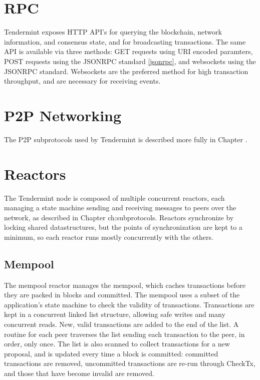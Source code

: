 \section{RPC}

Tendermint exposes HTTP API's for querying the blockchain, network information, and consensus state, and for broadcasting transactions.
The same API is available via three methods: GET requests using URI encoded paramters, POST requests using the JSONRPC standard \ref{jsonrpc}, 
and websockets using the JSONRPC standard. Websockets are the preferred method for high transaction throughput, 
and are necessary for receiving events.


\section{P2P Networking}

The P2P subprotocols used by Tendermint is described more fully in Chapter \cite{ch:subprotocols}.

\section{Reactors}

The Tendermint node is composed of multiple concurrent reactors, 
each managing a state machine sending and receiving messages to peers over the network, as described in Chapter {ch:subprotocols}.
Reactors synchronize by locking shared datastructures, but the points of synchronization are kept to a minimum,
so each reactor runs mostly concurrently with the others.

\subsection{Mempool}

The mempool reactor manages the mempool, 
which caches transactions before they are packed in blocks and committed.
The mempool uses a subset of the application's state machine to check the validity of transactions.
Transactions are kept in a concurrent linked list structure, allowing safe writes and many concurrent reads.
New, valid transactions are added to the end of the list. 
A routine for each peer traverses the list sending each transaction to the peer, in order, only once.
The list is also scanned to collect transactions for a new proposal, 
and is updated every time a block is committed: committed transactions are removed, 
uncommitted transactions are re-run through CheckTx, and those that have become invalid are removed.

